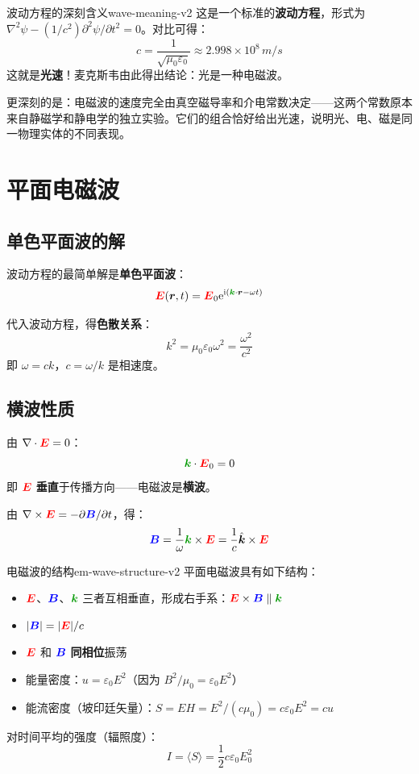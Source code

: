 \documentclass[11pt,a4paper,openany,oneside]{book}
\newcommand{\vecE}{\textcolor{red}{\vect{E}}}
\newcommand{\vecB}{\textcolor{blue}{\vect{B}}}
\newcommand{\vecK}{\textcolor{green!60!black}{\vect{k}}}
\newcommand{\ii}{\mathrm{i}}
\newcommand{\ee}{\mathrm{e}}
\newcommand{\eps}{\varepsilon}
\newcommand{\muz}{\mu_0}
\newcommand{\vect}[1]{\bm{#1}}
\newcommand{\unitvec}[1]{\hat{\vect{#1}}}
\newcommand{\curl}{\nabla\times}
\newcommand{\divg}{\nabla\cdot}
\newcommand{\lap}{\nabla^2}
\begin{document}
\begin{insight}{波动方程的深刻含义}{wave-meaning-v2}
这是一个标准的\textbf{波动方程}，形式为 $\lap\psi - (1/c^2)\partial^2\psi/\partial t^2 = 0$。对比可得：
\[
c = \frac{1}{\sqrt{\muz\eps_0}} \approx 2.998 \times 10^8 \, \si{m/s}
\]
这就是\textbf{光速}！麦克斯韦由此得出结论：光是一种电磁波。

更深刻的是：电磁波的速度完全由真空磁导率和介电常数决定——这两个常数原本来自静磁学和静电学的独立实验。它们的组合恰好给出光速，说明光、电、磁是同一物理实体的不同表现。
\end{insight}

\section{平面电磁波}

\subsection{单色平面波的解}

波动方程的最简单解是\textbf{单色平面波}：
\[
\vecE(\vect{r},t) = \vecE_0 \ee^{\ii(\vecK\cdot\vect{r} - \omega t)}
\]

代入波动方程，得\textbf{色散关系}：
\[
k^2 = \muz\eps_0\omega^2 = \frac{\omega^2}{c^2}
\]
即 $\omega = ck$，$c = \omega/k$ 是相速度。

\subsection{横波性质}

由 $\divg\vecE = 0$：
\[
\vecK \cdot \vecE_0 = 0
\]
即 $\vecE$ \textbf{垂直}于传播方向——电磁波是\textbf{横波}。

由 $\curl\vecE = -\partial\vecB/\partial t$，得：
\[
\vecB = \frac{1}{\omega}\vecK \times \vecE = \frac{1}{c}\unitvec{k} \times \vecE
\]

\begin{insight}{电磁波的结构}{em-wave-structure-v2}
平面电磁波具有如下结构：
\begin{itemize}
\item $\vecE$、$\vecB$、$\vecK$ 三者互相垂直，形成右手系：$\vecE \times \vecB \parallel \vecK$
\item $|\vecB| = |\vecE|/c$
\item $\vecE$ 和 $\vecB$ \textbf{同相位}振荡
\item 能量密度：$u = \eps_0 E^2$（因为 $B^2/\muz = \eps_0 E^2$）
\item 能流密度（坡印廷矢量）：$S = EH = E^2/(c\muz) = c\eps_0 E^2 = cu$
\end{itemize}

对时间平均的强度（辐照度）：
\[
I = \langle S \rangle = \frac{1}{2}c\eps_0 E_0^2
\]
\end{insight}
\end{document}
